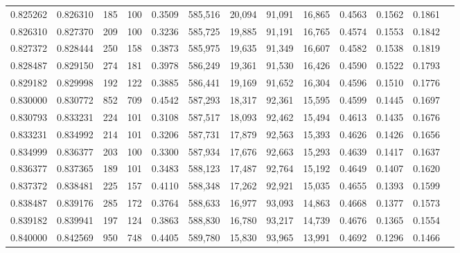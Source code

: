 \begin{tabular}{rrrrrrrrrrrrr}
0.825262 & 0.826310 &   185 & 100 &                                     0.3509 & 585,516 &  20,094 &  91,091 &  16,865 & 0.4563 & 0.1562 & 0.1861 \\
0.826310 & 0.827370 &   209 & 100 &                                     0.3236 & 585,725 &  19,885 &  91,191 &  16,765 & 0.4574 & 0.1553 & 0.1842 \\
0.827372 & 0.828444 &   250 & 158 &                                     0.3873 & 585,975 &  19,635 &  91,349 &  16,607 & 0.4582 & 0.1538 & 0.1819 \\
0.828487 & 0.829150 &   274 & 181 &                                     0.3978 & 586,249 &  19,361 &  91,530 &  16,426 & 0.4590 & 0.1522 & 0.1793 \\
0.829182 & 0.829998 &   192 & 122 &                                     0.3885 & 586,441 &  19,169 &  91,652 &  16,304 & 0.4596 & 0.1510 & 0.1776 \\
0.830000 & 0.830772 &   852 & 709 &                                     0.4542 & 587,293 &  18,317 &  92,361 &  15,595 & 0.4599 & 0.1445 & 0.1697 \\
0.830793 & 0.833231 &   224 & 101 &                                     0.3108 & 587,517 &  18,093 &  92,462 &  15,494 & 0.4613 & 0.1435 & 0.1676 \\
0.833231 & 0.834992 &   214 & 101 &                                     0.3206 & 587,731 &  17,879 &  92,563 &  15,393 & 0.4626 & 0.1426 & 0.1656 \\
0.834999 & 0.836377 &   203 & 100 &                                     0.3300 & 587,934 &  17,676 &  92,663 &  15,293 & 0.4639 & 0.1417 & 0.1637 \\
0.836377 & 0.837365 &   189 & 101 &                                     0.3483 & 588,123 &  17,487 &  92,764 &  15,192 & 0.4649 & 0.1407 & 0.1620 \\
0.837372 & 0.838481 &   225 & 157 &                                     0.4110 & 588,348 &  17,262 &  92,921 &  15,035 & 0.4655 & 0.1393 & 0.1599 \\
0.838487 & 0.839176 &   285 & 172 &                                     0.3764 & 588,633 &  16,977 &  93,093 &  14,863 & 0.4668 & 0.1377 & 0.1573 \\
0.839182 & 0.839941 &   197 & 124 &                                     0.3863 & 588,830 &  16,780 &  93,217 &  14,739 & 0.4676 & 0.1365 & 0.1554 \\
0.840000 & 0.842569 &   950 & 748 &                                     0.4405 & 589,780 &  15,830 &  93,965 &  13,991 & 0.4692 & 0.1296 & 0.1466 \\

\end{tabular}
